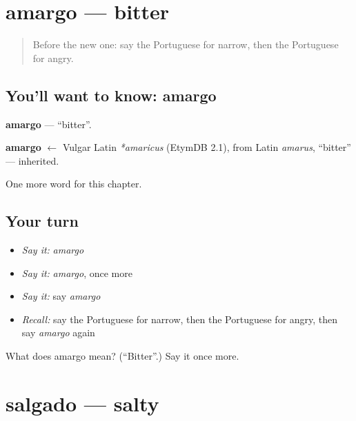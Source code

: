 \section[amargo]{amargo — bitter}

\label{lesson:PT-C127-amargo}



\begin{quote}
Before the new one: say the Portuguese for narrow, then the Portuguese for angry.
\end{quote}

\subsection*{You'll want to know: amargo}
\textbf{amargo} — \textquotedblleft{}bitter\textquotedblright{}.

\begin{cousinweb}
\textbf{amargo} $\leftarrow$ Vulgar Latin \emph{*amaricus} (EtymDB 2.1), from Latin \emph{amarus}, \textquotedblleft{}bitter\textquotedblright{} — inherited.
\end{cousinweb}

\begin{grammarlens}[title={What you've built}]
One more word for this chapter.
\end{grammarlens}

\subsection*{Your turn}
\begin{itemize}
\raggedright
  \item \emph{Say it:} \emph{amargo}
  \item \emph{Say it:} \emph{amargo}, once more
  \item \emph{Say it:} say \emph{amargo}
  \item \emph{Recall:} say the Portuguese for narrow, then the Portuguese for angry, then say \emph{amargo} again
\end{itemize}

\begin{tcolorbox}[breakable,colback=teal!4,colframe=teal!35!black,title={Before you move on}]
What does amargo mean? (\textquotedblleft{}Bitter\textquotedblright{}.) Say it once more.
\end{tcolorbox}
\section[salgado]{salgado — salty}

